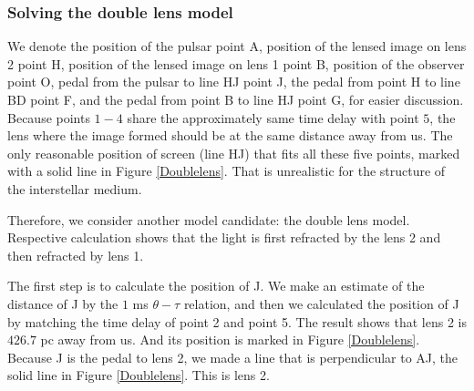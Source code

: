 \documentclass[useAMS,usenatbib]{mn2e}
\begin{document}
\subsubsection{Solving the double lens model}
We denote the position of the pulsar point A, position of the lensed image on lens 2 point H, position of the lensed image on lens 1 point B, position of the observer point O, pedal from the pulsar to line HJ point J, the pedal from point H to line BD point F, and the pedal from point B to line HJ point G, for easier discussion.
Because points $1-4$ share the approximately same time delay with point $5$, the lens where the image formed should be at the same distance away from us. The only reasonable position of screen (line HJ) that fits all these five points, marked with a solid line in Figure \ref{Doublelens}.  
That is unrealistic for the structure of the interstellar medium. 

Therefore, we consider another model candidate: the double lens model. Respective calculation shows that the light is first refracted by the lens 2 and then refracted by lens 1. 

The first step is to calculate the position of J. We make an estimate of the distance of J by the $1$ ms $\theta-\tau$ relation, and then we calculated the position of J by matching the time delay of point 2 and point 5. The result shows that lens 2 is $426.7$ pc away from us. And its position is marked in Figure \ref{Doublelens}. Because J is the pedal to lens 2, we made a line that is perpendicular to AJ, the solid line in Figure \ref{Doublelens}. This is lens 2.
\end{document}
